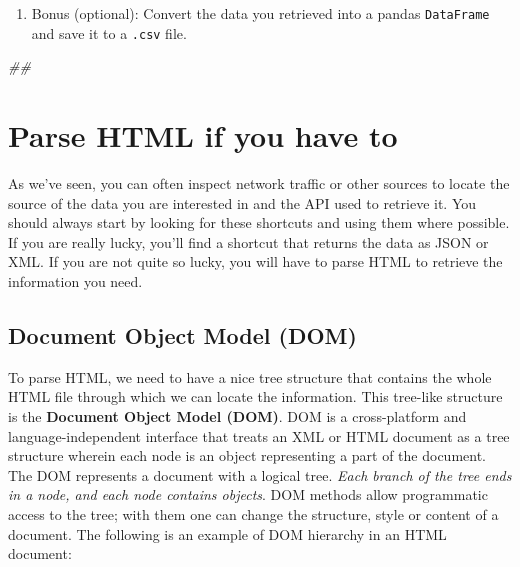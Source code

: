 \documentclass[
]{book}
\newenvironment{Shaded}{\begin{snugshade}}{\end{snugshade}}
\newcommand{\CommentTok}[1]{\textcolor[rgb]{0.56,0.35,0.01}{\textit{#1}}}
\providecommand{\tightlist}{%
  \setlength{\itemsep}{0pt}\setlength{\parskip}{0pt}}
\begin{document}
\begin{enumerate}
\def\labelenumi{\arabic{enumi}.}
\setcounter{enumi}{3}
\tightlist
\item
  Bonus (optional): Convert the data you retrieved into a pandas
  \texttt{DataFrame} and save it to a \texttt{.csv} file.
\end{enumerate}

\begin{Shaded}
\begin{Highlighting}[]
\CommentTok{##}
\end{Highlighting}
\end{Shaded}

\hypertarget{parse-html-if-you-have-to}{%
\section{Parse HTML if you have to}\label{parse-html-if-you-have-to}}

As we've seen, you can often inspect network traffic or other sources
to locate the source of the data you are interested in and the API
used to retrieve it. You should always start by looking for these
shortcuts and using them where possible. If you are really lucky,
you'll find a shortcut that returns the data as JSON or XML. If you
are not quite so lucky, you will have to parse HTML to retrieve the
information you need.

\hypertarget{document-object-model-dom}{%
\subsection{Document Object Model (DOM)}\label{document-object-model-dom}}

To parse HTML, we need to have a nice tree structure that contains the whole HTML file through which we can locate the information. This tree-like structure is the \textbf{Document Object Model (DOM)}. DOM is a cross-platform and language-independent interface that treats an XML or HTML document as a tree structure wherein each node is an object representing a part of the document. The DOM represents a document with a logical tree. \emph{Each branch of the tree ends in a node, and each node contains objects}. DOM methods allow programmatic access to the tree; with them one can change the structure, style or content of a document. The following is an example of DOM hierarchy in an HTML document:
\end{document}
